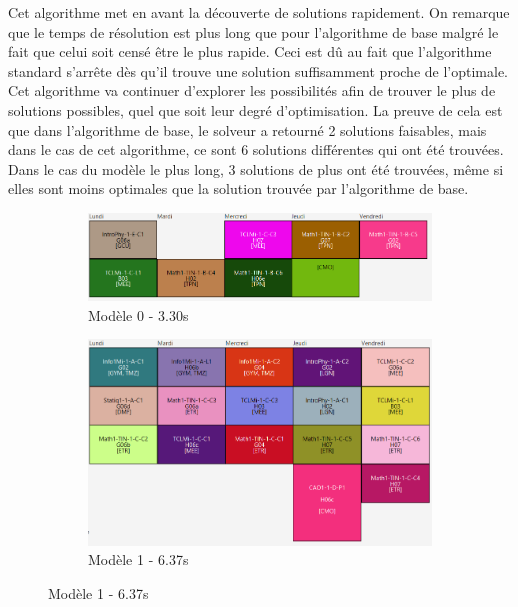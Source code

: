 Cet algorithme met en avant la découverte de solutions rapidement. On remarque que le temps de résolution est plus long que pour l'algorithme de base malgré le fait que celui soit censé être le plus rapide. Ceci est dû au fait que l'algorithme standard s'arrête dès qu'il trouve une solution suffisamment proche de l'optimale. Cet algorithme va continuer d'explorer les possibilités afin de trouver le plus de solutions possibles, quel que soit leur degré d'optimisation. La preuve de cela est que dans l'algorithme de base, le solveur a retourné 2 solutions faisables, mais dans le cas de cet algorithme, ce sont 6 solutions différentes qui ont été trouvées. Dans le cas du modèle le plus long, 3 solutions de plus ont été trouvées, même si elles sont moins optimales que la solution trouvée par l'algorithme de base.

\begin{figure}[H]
    \begin{subfigure}{0.3\linewidth}
        \centering
        \includegraphics[width=\linewidth]{./assets/figures/perfMIP3const0_3.30.png}
        \caption{Modèle 0 - 3.30s}
    \end{subfigure}
    \hfill
    \begin{subfigure}{0.3\linewidth}
        \centering
        \includegraphics[width=\linewidth]{./assets/figures/perfMIP3const1_6.37.png}
        \caption{Modèle 1 - 6.37s}
    \end{subfigure}

\end{figure}
